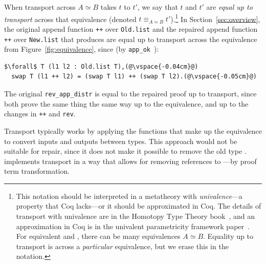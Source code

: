 When transport across $A \simeq B$ takes $t$ to $t'$,
we say that $t$ and $t'$ are \textit{equal up to transport}
across that equivalence (denoted $t \equiv_{A \simeq B} t'$).\footnote{This notation should be interpreted in a metatheory with \textit{univalence}---a property that Coq lacks---or it should be approximated in Coq.
The details of transport with univalence are in the Homotopy Type Theory book~\cite{univalent2013homotopy}, and an approximation in Coq is in the univalent parametricity framework paper~\cite{tabareau2017equivalences}. For equivalent \Aa and \B, there can be many equivalences $A \simeq B$.
Equality up to transport is across a \textit{particular} equivalence, but we erase this in the 
notation.}
In Section~\ref{sec:overview}, the original append function \lstinline{++} over \lstinline{Old.list}
and the repaired append function \lstinline{++} over \lstinline{New.list} that \toolnamec produces are
equal up to transport across the equivalence from Figure~\ref{fig:equivalence}, since (by \lstinline{app_ok}~\href{https://github.com/uwplse/pumpkin-pi/blob/v2.0.0/plugin/coq/Swap.v}{}):

\begin{lstlisting}
$\forall$ T (l1 l2 : Old.list T),(@\vspace{-0.04cm}@)
  swap T (l1 ++ l2) = (swap T l1) ++ (swap T l2).(@\vspace{-0.05cm}@)
\end{lstlisting}
The original \lstinline{rev_app_distr} is equal to the repaired proof up to transport,
since both prove the same thing the same way up to the equivalence, and up to the changes in \lstinline{++}
and \lstinline{rev}.

Transport typically works by applying the functions that make up the equivalence to convert
inputs and outputs between types.
This approach would not be suitable for repair, since it does not make it possible to remove the old type \Aa.
\toolnamec implements transport in a way that allows for removing references to \Aa---by proof term transformation.



